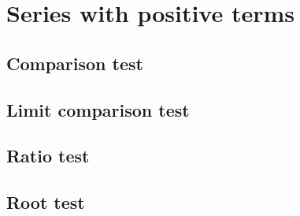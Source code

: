 \section{Series with positive terms}

\subsection{Comparison test}

\subsection{Limit comparison test}

\subsection{Ratio test}

\subsection{Root test}
